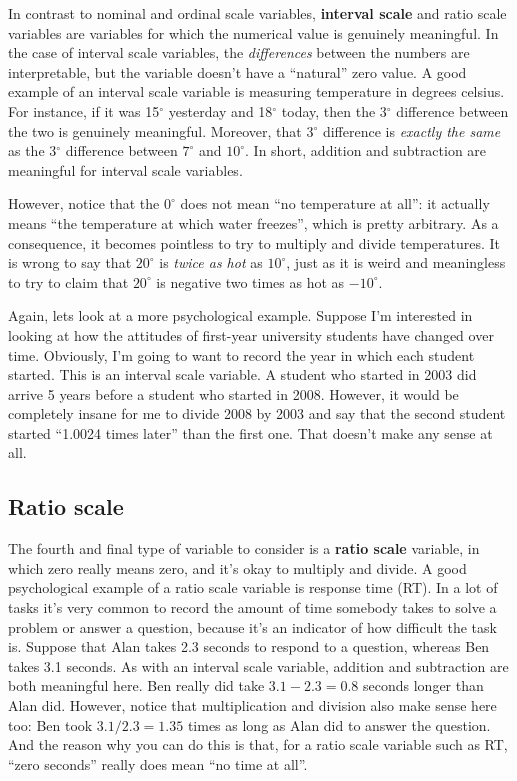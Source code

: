 \documentclass[
]{book}
\begin{document}
In contrast to nominal and ordinal scale variables, \textbf{interval scale} and ratio scale variables are variables for which the numerical value is genuinely meaningful. In the case of interval scale variables, the {\emph{differences}} between the numbers are interpretable, but the variable doesn't have a ``natural'' zero value. A good example of an interval scale variable is measuring temperature in degrees celsius. For instance, if it was 15\(^\circ\) yesterday and 18\(^\circ\) today, then the 3\(^\circ\) difference between the two is genuinely meaningful. Moreover, that 3\(^\circ\) difference is {\emph{exactly the same}} as the 3\(^\circ\) difference between \(7^\circ\) and \(10^\circ\). In short, addition and subtraction are meaningful for interval scale variables.

However, notice that the \(0^\circ\) does not mean ``no temperature at all'': it actually means ``the temperature at which water freezes'', which is pretty arbitrary. As a consequence, it becomes pointless to try to multiply and divide temperatures. It is wrong to say that \(20^\circ\) is {\emph{twice as hot}} as \(10^\circ\), just as it is weird and meaningless to try to claim that \(20^\circ\) is negative two times as hot as \(-10^\circ\).

Again, lets look at a more psychological example. Suppose I'm interested in looking at how the attitudes of first-year university students have changed over time. Obviously, I'm going to want to record the year in which each student started. This is an interval scale variable. A student who started in 2003 did arrive 5 years before a student who started in 2008. However, it would be completely insane for me to divide 2008 by 2003 and say that the second student started ``1.0024 times later'' than the first one. That doesn't make any sense at all.

\hypertarget{ratio-scale}{%
\subsection{Ratio scale}\label{ratio-scale}}

The fourth and final type of variable to consider is a \textbf{ratio scale} variable, in which zero really means zero, and it's okay to multiply and divide. A good psychological example of a ratio scale variable is response time (RT). In a lot of tasks it's very common to record the amount of time somebody takes to solve a problem or answer a question, because it's an indicator of how difficult the task is. Suppose that Alan takes 2.3 seconds to respond to a question, whereas Ben takes 3.1 seconds. As with an interval scale variable, addition and subtraction are both meaningful here. Ben really did take \(3.1 - 2.3 = 0.8\) seconds longer than Alan did. However, notice that multiplication and division also make sense here too: Ben took \(3.1 / 2.3 = 1.35\) times as long as Alan did to answer the question. And the reason why you can do this is that, for a ratio scale variable such as RT, ``zero seconds'' really does mean ``no time at all''.
\end{document}
